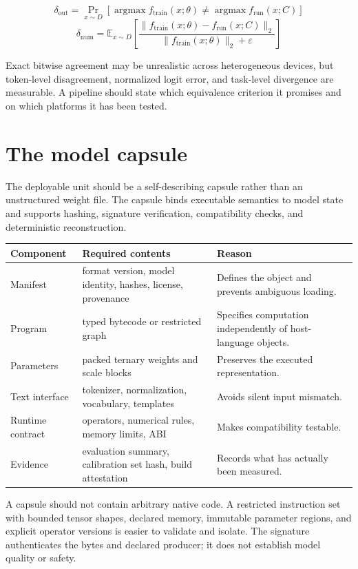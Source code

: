 \documentclass[11pt]{article}
\begin{document}
\[
\delta_{\text{out}} = \Pr_{x \sim D}\left[ \operatorname{argmax} f_{\text{train}}(x;\theta) \neq \operatorname{argmax} f_{\text{run}}(x;C) \right]
\]
\[
\delta_{\text{num}} = \mathbb{E}_{x \sim D}\left[ \frac{\|f_{\text{train}}(x;\theta) - f_{\text{run}}(x;C)\|_2}{\|f_{\text{train}}(x;\theta)\|_2 + \varepsilon} \right]
\]

Exact bitwise agreement may be unrealistic across heterogeneous devices, but token-level disagreement, normalized logit error, and task-level divergence are measurable. A pipeline should state which equivalence criterion it promises and on which platforms it has been tested.

\section{The model capsule}
The deployable unit should be a self-describing capsule rather than an unstructured weight file. The capsule binds executable semantics to model state and supports hashing, signature verification, compatibility checks, and deterministic reconstruction.

\begin{longtable}{L{3cm}L{5cm}L{5.5cm}}
\toprule
\textbf{Component} & \textbf{Required contents} & \textbf{Reason} \\
\midrule
\endhead
Manifest & format version, model identity, hashes, license, provenance & Defines the object and prevents ambiguous loading. \\
Program & typed bytecode or restricted graph & Specifies computation independently of host-language objects. \\
Parameters & packed ternary weights and scale blocks & Preserves the executed representation. \\
Text interface & tokenizer, normalization, vocabulary, templates & Avoids silent input mismatch. \\
Runtime contract & operators, numerical rules, memory limits, ABI & Makes compatibility testable. \\
Evidence & evaluation summary, calibration set hash, build attestation & Records what has actually been measured. \\
\bottomrule
\end{longtable}

A capsule should not contain arbitrary native code. A restricted instruction set with bounded tensor shapes, declared memory, immutable parameter regions, and explicit operator versions is easier to validate and isolate. The signature authenticates the bytes and declared producer; it does not establish model quality or safety.
\end{document}
